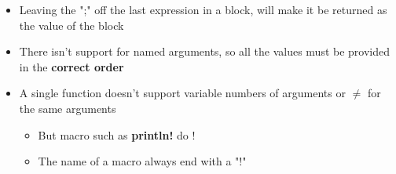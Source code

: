 \documentclass{report}
\begin{document}
\begin{itemize}
	\item Leaving the ";" off the last expression in a block, will make it be returned as the value of the block
	\item There isn't support for named arguments, so all the values must be provided in the \textbf{correct order}
	\item A single function doesn't support variable numbers of arguments or $\not =$ for the same arguments
		\begin{itemize} 
			\item But macro such as \textbf{println!} do ! 
			\item The name of a macro always end with a "!"
		\end{itemize}
\end{itemize}
\end{document}
